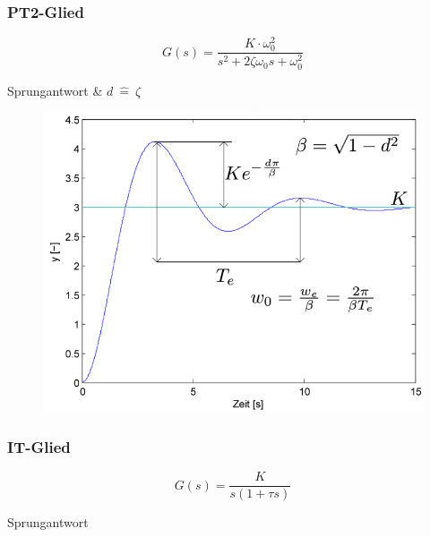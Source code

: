 \documentclass[
  10pt,
  a4paper,
]{article}
\numberwithin{equation}{section}
\begin{document}
\begin{multicols}{2}
\begin{figure}[H]
{}

\end{figure}

\hypertarget{pt2-glied}{%
\subsubsection{PT2-Glied}\label{pt2-glied}}

\[
G(s)=\frac{K\cdot \omega_0^2}{s^2+2\zeta\omega_0 s+\omega_0^2}
\]

Sprungantwort \& \(d\ \hat{=}\ \zeta\)

\begin{figure}[H]

{\centering \includegraphics{images/paste-19.png}

}

\end{figure}

\hypertarget{it-glied}{%
\subsubsection{IT-Glied}\label{it-glied}}

\[
G(s)=\frac{K}{s(1+\tau s)}
\]

Sprungantwort

\begin{figure}[H]


\end{figure}
\end{multicols}
\end{document}

